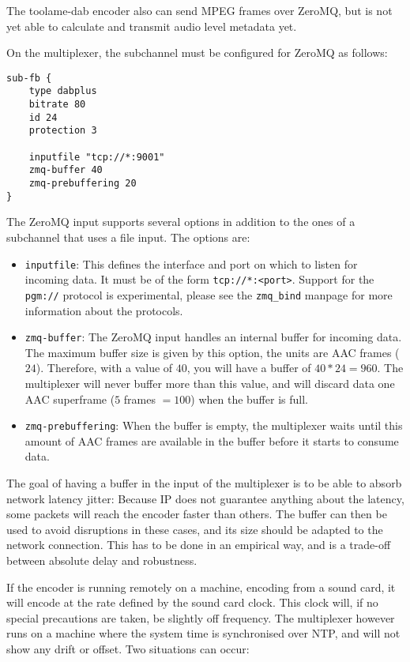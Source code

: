 The toolame-dab encoder also can send MPEG frames over ZeroMQ, but is not yet able to calculate and
transmit audio level metadata yet.


On the multiplexer, the subchannel must be configured for ZeroMQ as follows:
\begin{lstlisting}
sub-fb {
    type dabplus
    bitrate 80
    id 24
    protection 3

    inputfile "tcp://*:9001"
    zmq-buffer 40
    zmq-prebuffering 20
}
\end{lstlisting}

The ZeroMQ input supports several options in addition to the ones of a subchannel that uses a file
input. The options are:

\begin{itemize}
    \item \texttt{inputfile}: This defines the interface and port on which to listen for incoming
        data. It must be of the form \texttt{tcp://*:<port>}. Support for the \texttt{pgm://}
        protocol is experimental, please see the \texttt{zmq\_bind} manpage for more information
        about the protocols.
    \item \texttt{zmq-buffer}: The ZeroMQ input handles an internal buffer for incoming data. The
        maximum buffer size is given by this option, the units are AAC frames ($24$\ms). Therefore,
        with a value of $40$, you will have a buffer of $40 * 24 = 960$\ms. The multiplexer will
        never buffer more than this value, and will discard data one AAC superframe
        ($5$ frames $= 100$\ms) when the buffer is full.
    \item \texttt{zmq-prebuffering}: When the buffer is empty, the multiplexer waits until this
        amount of AAC frames are available in the buffer before it starts to consume data.
\end{itemize}

The goal of having a buffer in the input of the multiplexer is to be able to absorb network latency
jitter: Because IP does not guarantee anything about the latency, some packets will reach the
encoder faster than others. The buffer can then be used to avoid disruptions in these cases, and its
size should be adapted to the network connection. This has to be done in an empirical way, and is a
trade-off between absolute delay and robustness.

If the encoder is running remotely on a machine, encoding from a sound card, it will encode at the
rate defined by the sound card clock. This clock will, if no special precautions are taken, be
slightly off frequency. The multiplexer however runs on a machine where the system time is
synchronised over NTP, and will not show any drift or offset. Two situations can occur:

